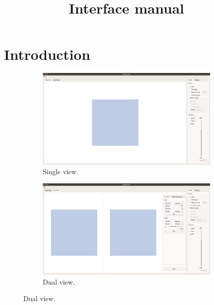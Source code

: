 \documentclass[12pt]{article}
\begin{document}
\title{ Interface manual }
\maketitle

\section{Introduction}

\begin{figure}
	\begin{subfigure}{0.5\textwidth}
		\centering
		\includegraphics[scale=0.1]{single-view}
		\caption{Single view.}
	\end{subfigure}
	\begin{subfigure}{0.5\textwidth}
		\centering
		\includegraphics[scale=0.1]{dual-view}
		\caption{Dual view.}
	\end{subfigure}
	\vspace{-10pt}
\end{figure}
\end{document}
